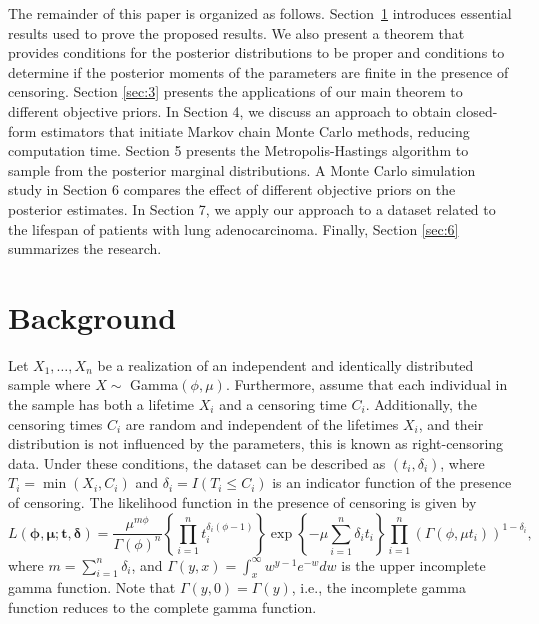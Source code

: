 \documentclass[]{interact}
\theoremstyle{plain}%
\theoremstyle{definition}
\theoremstyle{remark}
\begin{document}
The remainder of this paper is organized as follows. Section~\ref{sec:2} introduces essential results used to prove the proposed results. We also present a theorem that provides conditions for the posterior distributions to be proper and conditions to determine if the posterior moments of the parameters are finite in the presence of censoring. Section \ref{sec:3} presents the applications of our main theorem to different objective priors. In Section 4, we discuss an approach to obtain closed-form estimators that initiate Markov chain Monte Carlo methods, reducing computation time. Section 5 presents the Metropolis-Hastings algorithm to sample from the posterior marginal distributions. A Monte Carlo simulation study in Section 6 compares the effect of different objective priors on the posterior estimates. In Section 7, we apply our approach to a dataset related to the lifespan of patients with lung adenocarcinoma. Finally, Section \ref{sec:6} summarizes the research.

\section{Background}\label{sec:2}

Let $X_1,\ldots,X_n$ be a realization of an independent and identically distributed sample where $X\sim$ Gamma$(\phi,\mu)$. Furthermore, assume that each individual in the sample has both a lifetime $X_i$ and a censoring time $C_i$. Additionally, the censoring times $C_i$ are random and independent of the lifetimes $X_i$, and their distribution is not influenced by the parameters, {\color{black} this is known as right-censoring data}. Under these conditions, the dataset can be described as $(t_i,\delta_i)$, where $T_i=\min(X_i,C_i)$ and $\delta_i=I(T_i\leq C_i)$ is an indicator function of the presence of censoring. The likelihood function in the presence of censoring is given by
\begin{equation*}L(\boldsymbol{\phi,\mu; t,\delta})
=\frac{\mu^{m\phi}}{\Gamma(\phi)^n}\left\{\prod_{i=1}^n{t_i^{\delta_i(\phi-1)}}\right\}\exp\left\{-\mu\sum_{i=1}^n {\delta_i}t_i\right\}\prod_{i=1}^n\left(\Gamma(\phi,\mu t_i)\right)^{1-\delta_i},
\end{equation*}
where $m=\sum_{i=1}^{n}\delta_i$, and $\Gamma(y,x)  =\int_{x}^{\infty}{w^{y-1}e^{-w}dw}$ is the upper incomplete gamma function. Note that $\Gamma(y,0)=\Gamma(y)$, i.e., the incomplete gamma function reduces to the complete gamma function.
\end{document}
